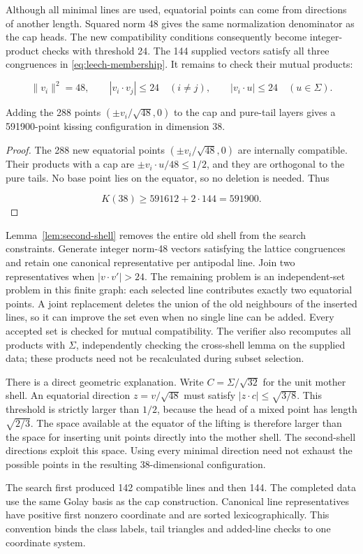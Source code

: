 Although all minimal lines are used, equatorial points can come from
directions of another length. Squared norm 48 gives the same normalization
denominator as the cap heads. The new compatibility conditions consequently
become integer-product checks with threshold 24.
The 144 supplied vectors satisfy all three congruences in
\eqref{eq:leech-membership}. It remains to check their mutual products:

\[
\|v_i\|^2=48,\qquad
|v_i\cdot v_j|\le24\quad(i\ne j),\qquad
|v_i\cdot u|\le24\quad(u\in\Sigma).
\]

\begin{proposition}
\label{prop:equatorial}
Adding the 288 points $(\pm v_i/\sqrt{48},0)$ to the cap and pure-tail
layers gives a 591900-point kissing configuration in dimension 38.
\end{proposition}
\begin{proof}
The 288 new equatorial points \((\pm v_i/\sqrt{48},0)\) are internally
compatible. Their products with a cap are \(\pm v_i\cdot u/48\le1/2\),
and they are orthogonal to the pure tails. No base point lies on the
equator, so no deletion is needed. Thus

\[
K(38)\ge591612+2\cdot144=591900.
\]
\end{proof}

Lemma~\ref{lem:second-shell} removes the entire old shell from the search
constraints. Generate integer norm-48 vectors satisfying the lattice
congruences and retain one canonical representative per antipodal line.
Join two representatives when $|v\cdot v'|>24$. The remaining problem is
an independent-set problem in this finite graph: each selected line
contributes exactly two equatorial points. A joint replacement deletes
the union of the old neighbours of the inserted lines, so it can improve
the set even when no single line can be added. Every accepted set is
checked for mutual compatibility. The verifier also recomputes all products
with $\Sigma$, independently checking the cross-shell lemma on the supplied
data; these products need not be recalculated during subset selection.

There is a direct geometric explanation. Write $C=\Sigma/\sqrt{32}$
for the unit mother shell. An equatorial direction $z=v/\sqrt{48}$
must satisfy $|z\cdot c|\le\sqrt{3/8}$. This threshold is strictly
larger than $1/2$, because the head of a mixed point has length
$\sqrt{2/3}$. The space available at the equator of the lifting is
therefore larger than the space for inserting unit points directly
into the mother shell. The second-shell directions exploit this
space. Using every minimal direction need not exhaust the possible
points in the resulting 38-dimensional configuration.

The search first produced 142 compatible lines and then 144.
The completed data use the same Golay basis as the cap
construction. Canonical line representatives have positive first nonzero
coordinate and are sorted lexicographically. This convention binds the
class labels, tail triangles and added-line checks to one coordinate
system.
